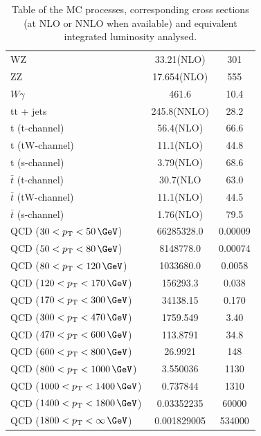 \begin{table}
{\begin{tabular}{|l|c|c|}
WZ                                                          & 33.21(NLO)    &     301 \\
ZZ                                                          & 17.654(NLO)   &     555 \\
$W \gamma$                                                  & 461.6         &    10.4 \\
tt + jets                                                   & 245.8(NNLO)   &    28.2 \\
t (t-channel)                                               & 56.4(NLO)     &    66.6 \\
t (tW-channel)                                              & 11.1(NLO)     &    44.8 \\
t (s-channel)                                               & 3.79(NLO)     &    68.6 \\
$\bar{t}$ (t-channel)                                       & 30.7(NLO      &    63.0 \\
$\bar{t}$ (tW-channel)                                      & 11.1(NLO)     &    44.5 \\
$\bar{t}$ (s-channel)                                       & 1.76(NLO)     &    79.5 \\
QCD ($30  <\pt<50    \,\GeV$)                               & 66285328.0    & 0.00009 \\
QCD ($50  <\pt<80    \,\GeV$)                               & 8148778.0     & 0.00074 \\
QCD ($80  <\pt<120   \,\GeV$)                               & 1033680.0     &  0.0058 \\
QCD ($120 <\pt<170   \,\GeV$)                               & 156293.3      &   0.038 \\
QCD ($170 <\pt<300   \,\GeV$)                               & 34138.15      &   0.170 \\
QCD ($300 <\pt<470   \,\GeV$)                               & 1759.549      &    3.40 \\
QCD ($470 <\pt<600   \,\GeV$)                               & 113.8791      &    34.8 \\
QCD ($600 <\pt<800   \,\GeV$)                               & 26.9921       &     148 \\
QCD ($800 <\pt<1000  \,\GeV$)                               & 3.550036      &    1130 \\
QCD ($1000<\pt<1400  \,\GeV$)                               & 0.737844      &    1310 \\
QCD ($1400<\pt<1800  \,\GeV$)                               & 0.03352235    &   60000 \\
QCD ($1800<\pt<\infty\,\GeV$)                               & 0.001829005   &  534000 \\
\hline
\end{tabular}
}
\caption{Table of the \gls{MC} processes, corresponding cross sections (at NLO or NNLO when available) and equivalent integrated luminosity analysed.}
\label{TABLE:ParkedDataAnalysis_MCSamples_Summary}
\end{table}

